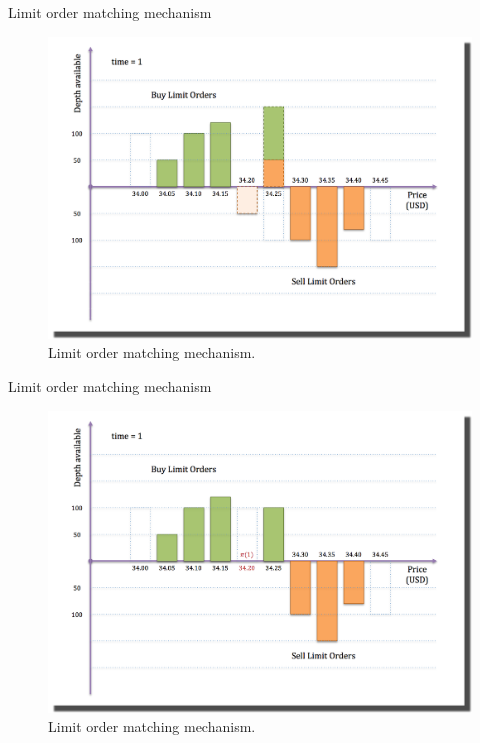 \documentclass{beamer}
\begin{document}
\begin{frame}[shrink=30]{{\color{cyan}Limit order matching mechanism}}
\bigskip
\begin{figure}[H]
	\centering
	\includegraphics[height=0.9\textheight]{LOB_Match/LOB_Match_2.png}
        \caption{Limit order matching mechanism.}
        \label{fig:LOB_2}
\end{figure}
\end{frame}

\begin{frame}[shrink=30]{{\color{cyan}Limit order matching mechanism}}
\bigskip
\begin{figure}[H]
	\centering
	\includegraphics[height=0.9\textheight]{LOB_Match/LOB_Match_3.png}
        \caption{Limit order matching mechanism.}
        \label{fig:LOB_3}
\end{figure}
\end{frame}
\end{document}
